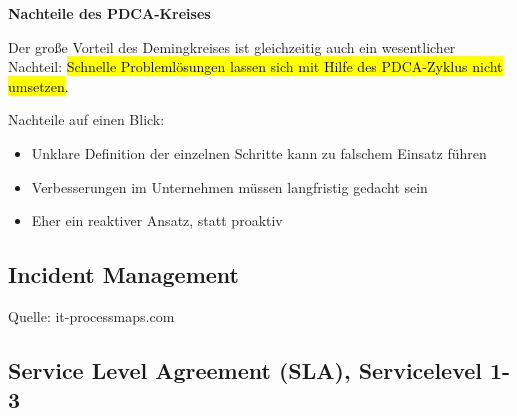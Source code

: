 \textbf{Nachteile des PDCA-Kreises}

Der große Vorteil des Demingkreises ist gleichzeitig auch ein wesentlicher Nachteil: \hl{Schnelle Problemlösungen lassen sich mit Hilfe des PDCA-Zyklus nicht umsetzen}.

Nachteile auf einen Blick:

\begin{itemize}
	\item Unklare Definition der einzelnen Schritte kann zu falschem Einsatz führen
	\item Verbesserungen im Unternehmen müssen langfristig gedacht sein
	\item Eher ein reaktiver Ansatz, statt proaktiv
\end{itemize}

\subsection{Incident Management}
\label{sec:IncidentManagement}


Quelle: it-processmaps.com \cite{incidentManagement}

\subsection{Service Level Agreement (SLA), Servicelevel 1-3}
\label{sec:ServiceLevelAgreement}






